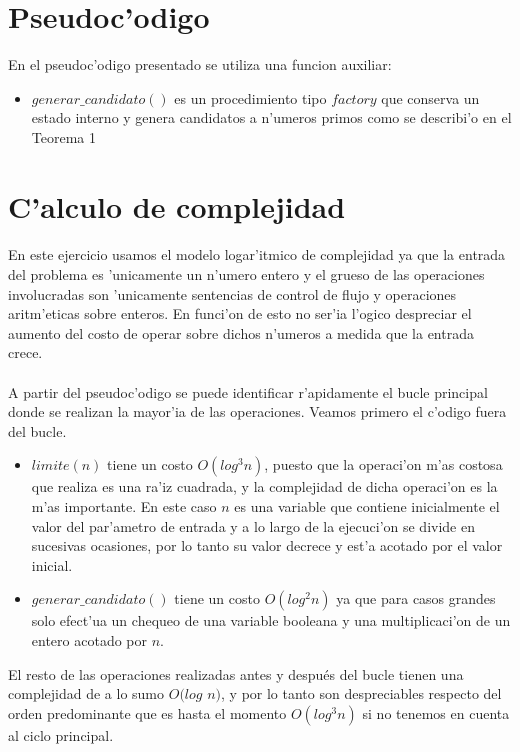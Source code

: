 \section{Pseudoc'odigo}


En el pseudoc'odigo presentado se utiliza una funcion auxiliar:
\begin{itemize}
\item $generar\_candidato()$ es un procedimiento tipo $factory$ que conserva un estado interno 
y genera candidatos a n'umeros primos como se describi'o en el Teorema 1
\end{itemize}

\section{C'alculo de complejidad}
\paragraph{}
En este ejercicio usamos el modelo logar'itmico de complejidad ya que la entrada del problema es 'unicamente un
n'umero entero y el grueso de las operaciones involucradas son 'unicamente sentencias de control de flujo
y operaciones aritm'eticas sobre enteros. En funci'on de esto no ser'ia l'ogico despreciar el aumento del costo
de operar sobre dichos n'umeros a medida que la entrada crece.

\paragraph{}
A partir del pseudoc'odigo se puede identificar r'apidamente el bucle principal donde se realizan la mayor'ia
de las operaciones. Veamos primero el c'odigo fuera del bucle.
\begin{itemize}
\item $limite(n)$ tiene un costo $O(log^3 n)$, puesto que la operaci'on m'as costosa que realiza es una ra'iz
cuadrada, y la complejidad de dicha operaci'on es la m'as importante. En este caso $n$ es una variable que contiene
inicialmente el valor del par'ametro de entrada y a lo largo de la ejecuci'on se divide en sucesivas ocasiones, por
lo tanto su valor decrece y est'a acotado por el valor inicial.
\item $generar\_candidato()$ tiene un costo $O(log^2 n)$ ya que para casos grandes solo efect'ua un chequeo de
una variable booleana y una multiplicaci'on de un entero acotado por $n$.
\end{itemize}
El resto de las operaciones realizadas antes y después del bucle tienen una complejidad de a lo sumo $O(log$ $n)$,
y por lo tanto son despreciables respecto del orden predominante que es hasta el momento $O(log^3 n)$ si no tenemos
en cuenta al ciclo principal.

